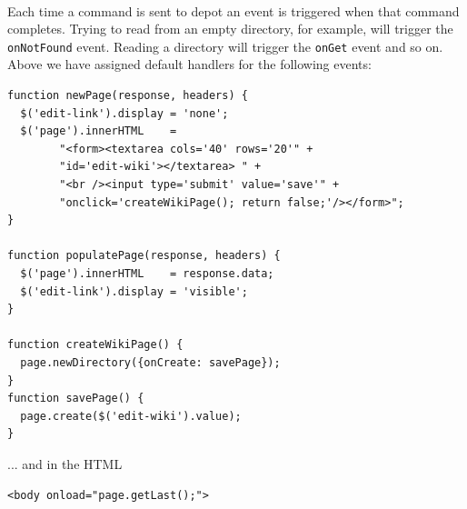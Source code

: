 \documentclass{report}
\begin{document}
\paragraph{}
Each time a command is sent to depot an event is triggered when that
command completes. Trying to read from an empty directory, for
example, will trigger the \texttt{onNotFound} event. Reading a
directory will trigger the \texttt{onGet} event and so on. Above we
have assigned default handlers for the following events: 


\begin{Verbatim}[frame=single]
function newPage(response, headers) {
  $('edit-link').display = 'none';
  $('page').innerHTML    = 
        "<form><textarea cols='40' rows='20'" +
        "id='edit-wiki'></textarea> " + 
        "<br /><input type='submit' value='save'" + 
        "onclick='createWikiPage(); return false;'/></form>";
}

function populatePage(response, headers) {
  $('page').innerHTML    = response.data;
  $('edit-link').display = 'visible'; 
}

function createWikiPage() {
  page.newDirectory({onCreate: savePage});
}
function savePage() {
  page.create($('edit-wiki').value);
}
\end{Verbatim}

 
... and in the HTML
\begin{Verbatim}[frame=single]
<body onload="page.getLast();">
\end{Verbatim}
\end{document}
